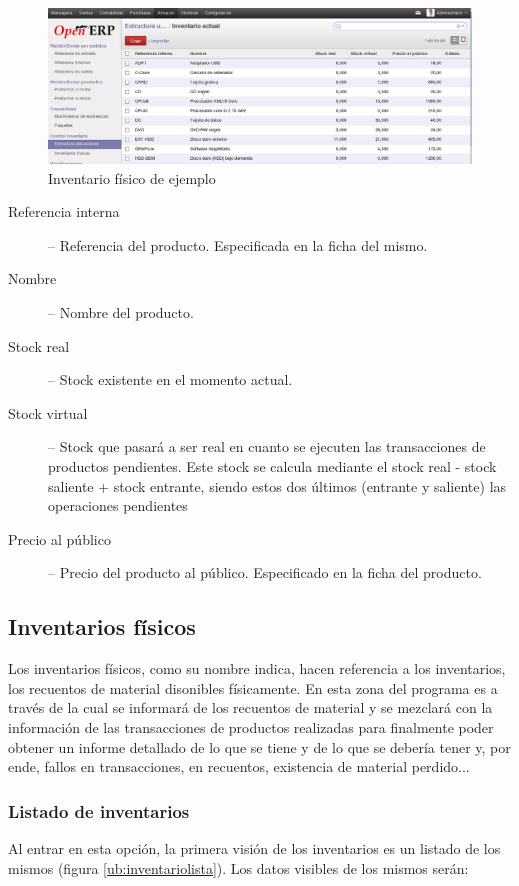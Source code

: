\begin{figure}[H]
\includegraphics[width=\textwidth]{almacen/img/ubi_inventario.png}
\caption{Inventario físico de ejemplo}
\label{ub:inventarioej}
\end{figure}


\begin{description}
  \item[Referencia interna] -- Referencia del producto. Especificada en la ficha del mismo.
  \item[Nombre] -- Nombre del producto.
  \item[Stock real] -- Stock existente en el momento actual.
  \item[Stock virtual] -- Stock que pasará a ser real en cuanto se ejecuten las transacciones de productos pendientes. Este stock se calcula mediante
                          el stock real - stock saliente + stock entrante, siendo estos dos últimos (entrante y saliente) las operaciones pendientes
  \item[Precio al público] -- Precio del producto al público. Especificado en la ficha del producto.
\end{description}


\subsection{Inventarios físicos}
Los inventarios físicos, como su nombre indica, hacen referencia a los inventarios, los recuentos de material disonibles físicamente. En esta zona del
programa es a través de la cual se informará de los recuentos de material y se mezclará con la información de las transacciones de productos realizadas
para finalmente poder obtener un informe detallado de lo que se tiene y de lo que se debería tener y, por ende, fallos en transacciones, en recuentos, 
existencia de material perdido...

\subsubsection{Listado de inventarios}
Al entrar en esta opción, la primera visión de los inventarios es un listado de los mismos (figura \ref{ub:inventariolista}). Los datos visibles de los mismos serán:

